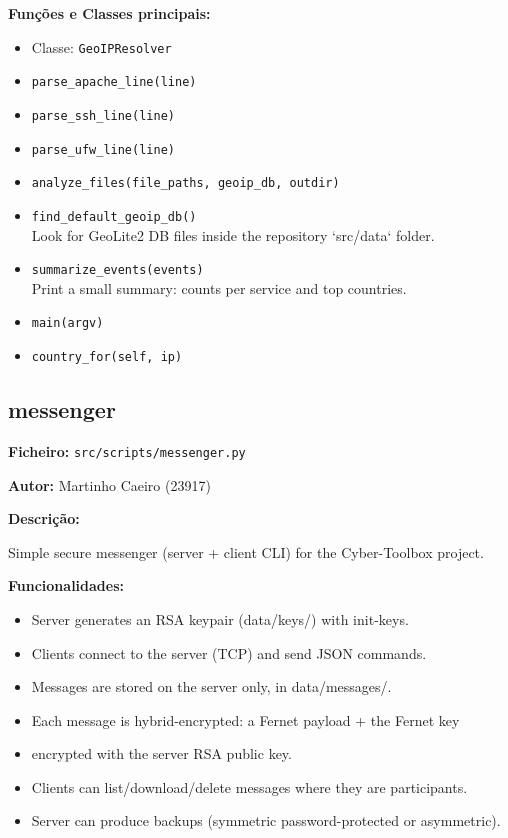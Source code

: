 \documentclass[a4paper,11pt]{article}
\begin{document}
\textbf{Funções e Classes principais:}
\begin{itemize}
    \item Classe: \texttt{GeoIPResolver}
    \item \texttt{parse\_apache\_line(line)}
    \item \texttt{parse\_ssh\_line(line)}
    \item \texttt{parse\_ufw\_line(line)}
    \item \texttt{analyze\_files(file\_paths, geoip\_db, outdir)}
    \item \texttt{find\_default\_geoip\_db()}
    \\ Look for GeoLite2 DB files inside the repository `src/data` folder.
    \item \texttt{summarize\_events(events)}
    \\ Print a small summary: counts per service and top countries.
    \item \texttt{main(argv)}
    \item \texttt{country\_for(self, ip)}
\end{itemize}

\newpage
\subsection{messenger}
\label{sec:messenger}

\textbf{Ficheiro:} \texttt{src/scripts/messenger.py}

\textbf{Autor:} Martinho Caeiro (23917)

\textbf{Descrição:}

Simple secure messenger (server + client CLI) for the Cyber-Toolbox project.

\textbf{Funcionalidades:}
\begin{itemize}
    \item Server generates an RSA keypair (data/keys/) with init-keys.
    \item Clients connect to the server (TCP) and send JSON commands.
    \item Messages are stored on the server only, in data/messages/.
    \item Each message is hybrid-encrypted: a Fernet payload + the Fernet key
    \item encrypted with the server RSA public key.
    \item Clients can list/download/delete messages where they are participants.
    \item Server can produce backups (symmetric password-protected or asymmetric).
\end{itemize}
\end{document}
